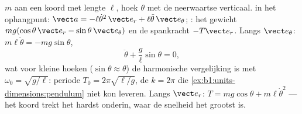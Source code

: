 \begin{example}\label{ex:b1:newton-dynamics:pendulum}
 $m$ aan een koord met lengte $\ell$, hoek $\theta$ met de neerwaartse
verticaal.  in het ophangpunt: $\vect a =
-\ell\dot\theta^2\,\vect e_r + \ell\ddot\theta\,\vect e_\theta$; :
het gewicht $mg(\cos\theta\,\vect e_r - \sin\theta\,\vect e_\theta)$ en de
spankracht $-T\vect e_r$. Langs $\vect e_\theta$: $m\ell\ddot\theta =
-mg\sin\theta$,
\[
\ddot\theta + \frac{g}{\ell}\sin\theta = 0 ,
\]
wat voor kleine hoeken ($\sin\theta \approx \theta$) de harmonische
vergelijking is met $\omega_0 = \sqrt{g/\ell}$: periode $T_0 = 2\pi\sqrt{\ell/g}$,
de $k = 2\pi$ die \cref{ex:b1:units-dimensions:pendulum} niet kon
leveren. Langs $\vect e_r$: $T = mg\cos\theta + m\ell\dot\theta^2$ --- het
koord trekt het hardst onderin, waar de snelheid het grootst is.
\end{example}


